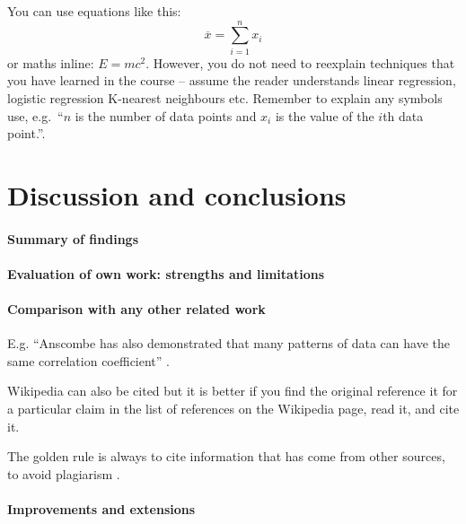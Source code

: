 \documentclass[11pt,a4paper]{article}
\begin{document}
You can use equations like this:
\begin{equation}
  \label{fds-project-template:eq:1}
  \overline{x} = \sum_{i=1}^n x_i
\end{equation}
or maths inline: $E=mc^2$. However, you do not need to reexplain techniques that you have learned in the course -- assume the reader understands linear regression, logistic regression K-nearest neighbours etc.  Remember to explain any symbols use, e.g.~``$n$ is the number of data points and $x_i$ is the value of the $i$th data point.''.

\section{Discussion and conclusions}

\paragraph{Summary of findings}

\paragraph{Evaluation of own work: strengths and limitations}

\paragraph{Comparison with any other related work}
E.g. ``Anscombe has also demonstrated that many patterns of data can
have the same correlation coefficient'' \cite{anscombe1973graphs}.

Wikipedia can also be cited but it is better if you find the original
reference it for a particular claim in the list of references on the
Wikipedia page, read it, and cite it.

The golden rule is always to cite information that has come from other
sources, to avoid plagiarism \cite{wiki:plagarism}.

\paragraph{Improvements and extensions}


\printbibliography
\end{document}
